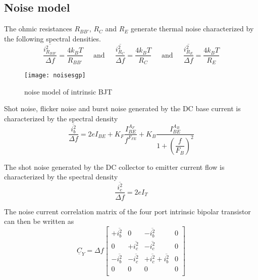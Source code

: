 \subsection{Noise model}

The ohmic resistances $R_{BB'}$, $R_C$ and $R_E$ generate thermal
noise characterized by the following spectral densities.
\begin{equation}
\dfrac{\overline{i_{R_{BB'}}^2}}{\Delta f} = \dfrac{4 k_B T}{R_{BB'}}
\;\;\;\; \textrm{ and } \;\;\;\;
\dfrac{\overline{i_{R_C}^2}}{\Delta f} = \dfrac{4 k_B T}{R_C}
\;\;\;\; \textrm{ and } \;\;\;\;
\dfrac{\overline{i_{R_E}^2}}{\Delta f} = \dfrac{4 k_B T}{R_E}
\end{equation}

\begin{figure}[ht]
\begin{center}
\texttt{[image: noisesgp]}
\end{center}
\caption{noise model of intrinsic BJT}
\label{fig:noisesgp}
\end{figure}
\FloatBarrier

Shot noise, flicker noise and burst noise generated by the DC base
current is characterized by the spectral density
\begin{equation}
\dfrac{\overline{i_{b}^2}}{\Delta f} = 2e I_{BE} + K_F\dfrac{I_{BE}^{A_F}}{f^{F_{FE}}} + K_B\dfrac{I_{BE}^{A_B}}{1 + \left(\dfrac{f}{F_B}\right)^2}
\end{equation}

The shot noise generated by the DC collector to emitter current flow
is characterized by the spectral density
\begin{equation}
\dfrac{\overline{i_{c}^2}}{\Delta f} = 2e I_{T}
\end{equation}

The noise current correlation matrix of the four port intrinsic
bipolar transistor can then be written as
\begin{equation}
\underline{C}_Y = \Delta f
\begin{bmatrix}
+\overline{i_{b}^2} & 0 & -\overline{i_{b}^2} & 0\\
0 & +\overline{i_{c}^2} & -\overline{i_{c}^2} & 0\\
-\overline{i_{b}^2} & -\overline{i_{c}^2} & +\overline{i_{c}^2} +\overline{i_{b}^2} & 0\\
0 & 0 & 0 & 0\\
\end{bmatrix}
\end{equation}

